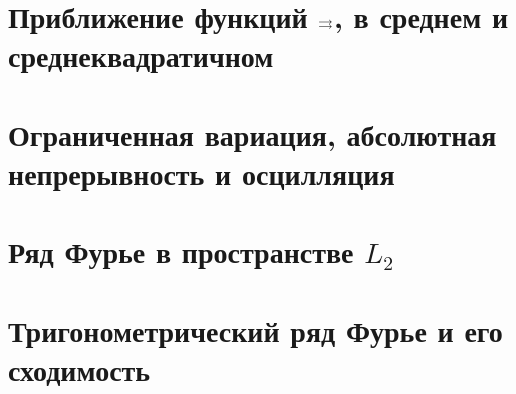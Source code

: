 

\section{Приближение функций \texorpdfstring{$\rightrightarrows$}{равномерно}, в среднем и среднеквадратичном}

 
 
 
 
 


\section{Ограниченная вариация, абсолютная непрерывность и осцилляция}










\section{Ряд Фурье в пространстве \texorpdfstring{$L_2$}{L2}}
 
 
 
 


\section{Тригонометрический ряд Фурье и его сходимость}
 
 
 
 
%  
%  
%  
% 


%  
%  
